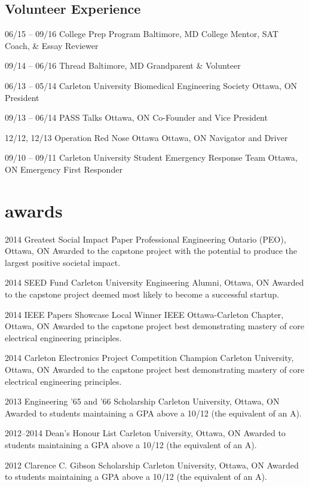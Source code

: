\documentclass[]{friggeri-cv} %
\begin{document}
\subsection{Volunteer Experience}

\begin{entrylist}
\entry
{06/15 -- 09/16}
{College Prep Program}
{Baltimore, MD}
{College Mentor, SAT Coach, \& Essay Reviewer}

\entry
{09/14 -- 06/16}
{Thread}
{Baltimore, MD}
{Grandparent \& Volunteer}

\entry
{06/13 -- 05/14}
{Carleton University Biomedical Engineering Society}
{Ottawa, ON}
{President}

\entry
{09/13 -- 06/14}
{PASS Talks}
{Ottawa, ON}
{Co-Founder and Vice President}

\entry
{12/12, 12/13}
{Operation Red Nose Ottawa}
{Ottawa, ON}
{Navigator and Driver}

\entry
{09/10 -- 09/11}
{Carleton University Student Emergency Response Team}
{Ottawa, ON}
{Emergency First Responder}
\end{entrylist}


\section{awards}

\begin{entrylist}
\entry
{2014}
{Greatest Social Impact Paper}
{Professional Engineering Ontario (PEO), Ottawa, ON}
{Awarded to the capstone project with the potential to produce the largest positive societal impact.}

\entry
{2014}
{SEED Fund}
{Carleton University Engineering Alumni, Ottawa, ON}
{Awarded to the capstone project deemed most likely to become a successful startup.}

\entry
{2014}
{IEEE Papers Showcase Local Winner}
{IEEE Ottawa-Carleton Chapter, Ottawa, ON}
{Awarded to the capstone project best demonstrating mastery of core electrical engineering principles.}

\entry
{2014}
{Carleton Electronics Project Competition Champion}
{Carleton University, Ottawa, ON}
{Awarded to the capstone project best demonstrating mastery of core electrical engineering principles.}

\entry
{2013}
{Engineering '65 and '66 Scholarship}
{Carleton University, Ottawa, ON}
{Awarded to students maintaining a GPA above a 10/12 (the equivalent of an A).}

\entry
{2012--2014}
{Dean's Honour List}
{Carleton University, Ottawa, ON}
{Awarded to students maintaining a GPA above a 10/12 (the equivalent of an A).}

\entry
{2012}
{Clarence C. Gibson Scholarship}
{Carleton University, Ottawa, ON}
{Awarded to students maintaining a GPA above a 10/12 (the equivalent of an A).}
\end{entrylist}
\end{document}
